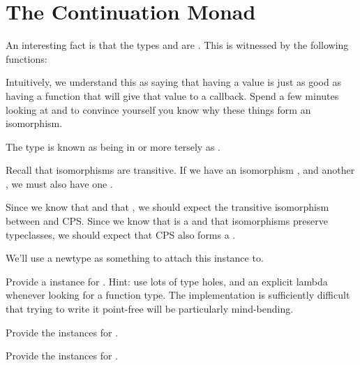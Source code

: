 \documentclass[book.tex]{subfiles}
\begin{document}
\section{The Continuation Monad}

An interesting fact is that the types  and 
are . This is witnessed by the following
functions:


Intuitively, we understand this as saying that having a value is just as good as
having a function that will give that value to a callback. Spend a few minutes
looking at  and  to convince yourself you know why these
things form an isomorphism.

The type  is known as being in
 or more tersely as .

Recall that isomorphisms are transitive. If we have an isomorphism ,
and another , we must also have one .

Since we know that  and that , we should expect the transitive isomorphism between  and CPS.
Since we know that  is a  and that isomorphisms
preserve typeclasses, we should expect that CPS also forms a .

We'll use a newtype as something to attach this instance to.


\begin{exercise}
Provide a  instance for . Hint: use lots of type holes, and
  an explicit lambda whenever looking for a function type. The implementation is
  sufficiently difficult that trying to write it point-free will be particularly
  mind-bending.
\end{exercise}
\begin{solution}
\end{solution}

\begin{exercise}
Provide the  instances for .
\end{exercise}
\begin{solution}
\end{solution}

\begin{exercise}
Provide the  instances for .
\end{exercise}
\begin{solution}
\end{solution}
\end{document}
